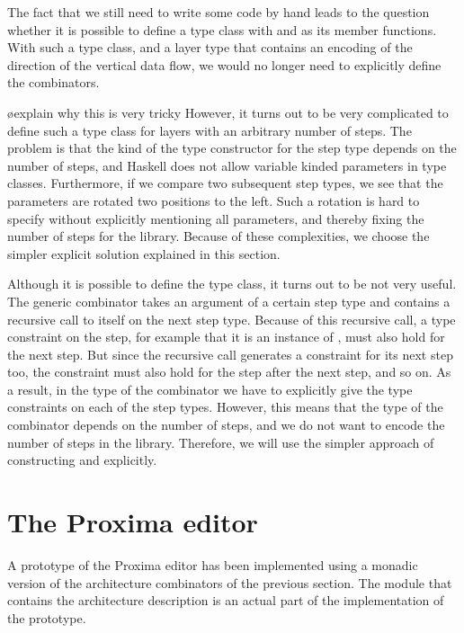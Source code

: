 \documentclass[preprint,natbib]{sigplanconf}
\begin{document}
The fact that we still need to write some code by hand leads to the question whether it is possible to define a type class with   and  as its member functions. With such a type class, and a layer type that contains an encoding of the direction of the vertical data flow, we would no longer need to explicitly define the combinators.

\bl
\o explain why this is very tricky
\el
\bc
However, it turns out to be very complicated to define such a type class for layers with an arbitrary number of steps. The problem is that the kind of the type constructor for the step type depends on the number of steps, and Haskell does not allow variable kinded parameters in type classes. Furthermore, if we compare two subsequent step types, we see that the parameters are rotated two positions to the left. Such a rotation is hard to specify without explicitly mentioning all parameters, and thereby fixing the number of steps for the library. Because of these complexities, we choose the simpler explicit solution explained in this section.
\ec

\bc Although it is possible to define the type class, it turns out to be not very useful. The generic combinator takes an argument of a certain step type and contains a recursive call to itself on the next step type. Because of this recursive call, a type constraint on the step, for example that it is an instance of , must also hold for the next step. But since the recursive call generates a constraint for its next step too, the constraint must also hold for the step after the next step, and so on. As a result, in the type of the combinator we have to explicitly give the type constraints on each of the step types. However, this means that the type of the combinator depends on the number of steps, and we do not want to encode the number of steps in the library. Therefore, we will use the simpler approach of constructing  and  explicitly. \ec





%																
%																
%																
\section{The Proxima editor} \label{sect:proxima}


A prototype of the Proxima editor has been implemented using a monadic version of the architecture combinators of the previous section. The module that contains the architecture description is an actual part of the implementation of the prototype.
\end{document}
